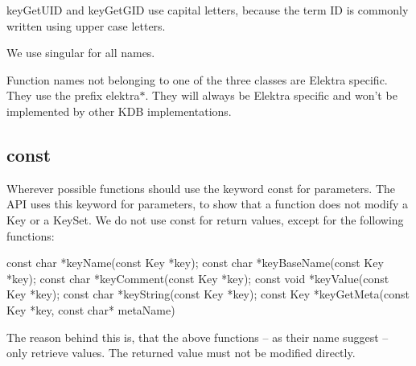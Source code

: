 {\ttfamily key\+Get\+U\+I\+D} and {\ttfamily key\+Get\+G\+I\+D} use capital letters, because the term I\+D is commonly written using upper case letters.

We use singular for all names.

Function names not belonging to one of the three classes are Elektra specific. They use the prefix {\ttfamily elektra$\ast$}. They will always be Elektra specific and won't be implemented by other K\+D\+B implementations.

\subsection*{const}

Wherever possible functions should use the keyword {\ttfamily const} for parameters. The A\+P\+I uses this keyword for parameters, to show that a function does not modify a {\ttfamily Key} or a {\ttfamily Key\+Set}. We do not use {\ttfamily const} for return values, except for the following functions\+: \begin{DoxyVerb}    const char *keyName(const Key *key);
    const char *keyBaseName(const Key *key);
    const char *keyComment(const Key *key);
    const void *keyValue(const Key *key);
    const char *keyString(const Key *key);
    const Key  *keyGetMeta(const Key *key, const char* metaName)
\end{DoxyVerb}


The reason behind this is, that the above functions – as their name suggest – only retrieve values. The returned value must not be modified directly. 